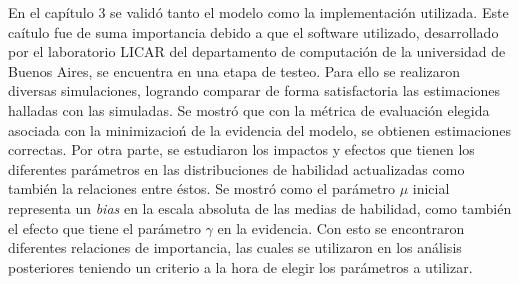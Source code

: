 \documentclass[11pt,twoside,spanish]{report} %
\begin{document}
En el cap\'itulo 3 se valid\'o tanto el modelo como la implementaci\'on utilizada.
Este ca\'itulo fue de suma importancia debido a que el software utilizado, desarrollado por el laboratorio LICAR del departamento de computaci\'on de la universidad de Buenos Aires, se encuentra en una etapa de testeo.
Para ello se realizaron diversas simulaciones, logrando comparar de forma satisfactoria las estimaciones halladas con las simuladas.
Se mostr\'o que con la m\'etrica de evaluaci\'on elegida asociada con la minimizacio\'n de la evidencia del modelo, se obtienen estimaciones correctas.
Por otra parte, se estudiaron los impactos y efectos que tienen los diferentes par\'ametros en las distribuciones de habilidad actualizadas como tambi\'en la relaciones entre \'estos.
Se mostr\'o  como el par\'ametro $\mu$ inicial representa un \textit{bias} en la escala absoluta de las medias de habilidad, como tambi\'en el efecto que tiene el par\'ametro $\gamma$ en la evidencia.
Con esto se encontraron diferentes relaciones de importancia, las cuales se utilizaron en los an\'alisis posteriores teniendo un criterio a la hora de elegir los par\'ametros a utilizar.
\end{document}
